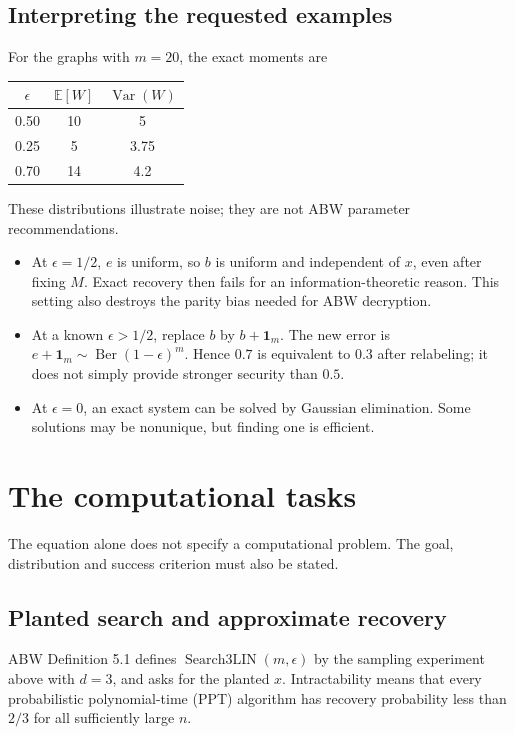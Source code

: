 \documentclass[11pt,a4paper]{article}
\newcommand{\E}{\mathbb E}
\newcommand{\Ber}{\operatorname{Ber}}
\newcommand{\Search}{\operatorname{Search3LIN}}
\newcommand{\one}{\mathbf 1}
\begin{document}
\subsection{Interpreting the requested examples}
For the graphs with $m=20$, the exact moments are
\begin{center}
\begin{tabular}{ccc}\toprule
$\epsilon$ & $\E[W]$ & $\operatorname{Var}(W)$\\\midrule
0.50 &10&5\\0.25&5&3.75\\0.70&14&4.2\\\bottomrule
\end{tabular}
\end{center}
These distributions illustrate noise; they are not ABW parameter recommendations.
\begin{itemize}
\item At $\epsilon=1/2$, $e$ is uniform, so $b$ is uniform and independent of $x$, even after fixing $M$. Exact recovery then fails for an information-theoretic reason. This setting also destroys the parity bias needed for ABW decryption.
\item At a known $\epsilon>1/2$, replace $b$ by $b+\one_m$. The new error is $e+\one_m\sim\Ber(1-\epsilon)^m$. Hence $0.7$ is equivalent to $0.3$ after relabeling; it does not simply provide stronger security than $0.5$.
\item At $\epsilon=0$, an exact system can be solved by Gaussian elimination. Some solutions may be nonunique, but finding one is efficient.
\end{itemize}

\section{The computational tasks}\label{sec:tasks}
The equation alone does not specify a computational problem. The goal, distribution and success criterion must also be stated.

\subsection{Planted search and approximate recovery}
ABW Definition 5.1 defines $\Search(m,\epsilon)$ by the sampling experiment above with $d=3$, and asks for the planted $x$. Intractability means that every probabilistic polynomial-time (PPT) algorithm has recovery probability less than $2/3$ for all sufficiently large $n$.
\end{document}
